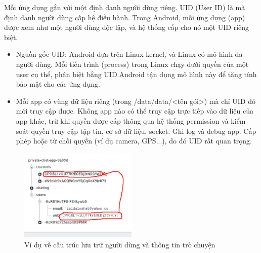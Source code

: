 \renewcommand{\labelitemi}{--}    
        Mỗi ứng dụng gắn với một định danh người dùng riêng. UID (User ID) là mã định danh người dùng cấp hệ điều hành. Trong Android, mỗi ứng dụng (app) được xem như một người dùng độc lập, và hệ thống cấp cho nó một UID riêng biệt.
        \setlength{\leftmargini}{1.5cm}
        \begin{itemize}
            \item Nguồn gốc UID: Android dựa trên Linux kernel, và Linux có mô hình đa người dùng. Mỗi tiến trình (process) trong Linux chạy dưới quyền của một user cụ thể, phân biệt bằng UID.Android tận dụng mô hình này để tăng tính bảo mật cho các ứng dụng.
            \item Mỗi app có vùng dữ liệu riêng (trong /data/data/<tên gói>) mà chỉ UID đó mới truy cập được. Không app nào có thể truy cập trực tiếp vào dữ liệu của app khác, trừ khi quyền được cấp thông qua hệ thống permission và kiểm soát quyền truy cập tập tin, cơ sở dữ liệu, socket. Ghi log và debug app. Cấp phép hoặc từ chối quyền (ví dụ camera, GPS...), do đó UID rất quan trọng.
        \end{itemize}

        \begin{figure}[H] 
            \centering
            \includegraphics[width=0.5\textwidth]{images/uid.png}
            \caption{Ví dụ về cấu trúc lưu trữ người dùng và thông tin trò chuyện}
            \label{fig:android}
        \end{figure}

